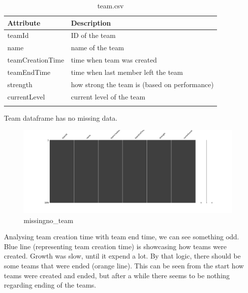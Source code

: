 \begin{center}
\begin{longtable}{ |l|l| } 
 \hline
 Attribute & Description\\ 
 \hline
 teamId & ID of the team\\ 
 \hline
 name & name of the team\\ 
 \hline
 teamCreationTime & time when team was created\\ 
 \hline
 teamEndTime & time when last member left the team\\ 
 \hline
 strength & how strong the team is (based on performance)\\ 
 \hline
 currentLevel & current level of the team\\ 
 \hline
\caption{team.csv}
\end{longtable}
\end{center}

Team dataframe has no missing data.
\begin{figure}[H]
\includegraphics[scale=0.25]{img/Graphs/team/missingno_team.png}
\centering
\caption{missingno\_team}
\label{fig:missingno_team}
\end{figure}



Analysing team creation time with team end time, we can see something odd. Blue line (representing team creation time) is showcasing how teams were created. Growth was slow, until it expend a lot. By that logic, there should be some teams that were ended (orange line). This can be seen from the start how teams were created and ended, but after a while there seems to be nothing regarding ending of the teams.

